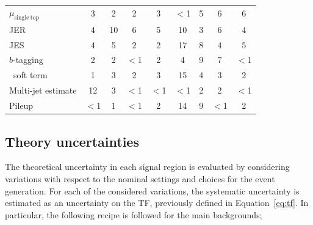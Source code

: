 \begin{table}[htpb]
\begin{center}
\begin{tabular}{lcccccccc}
						{$\mu_{\mathrm{single~top}}$} & 3 & 2 & 2 & 3 & {$<$1\phantom{15}} & 5 & 6 & 6\\  
						{JER} & 4 & 10 & 6 & 5 & 10 & 3 & 6 & 4\\  
						{JES} & 4 & 5 & 2 & 2 & 17 & 8 & 4 & 5\\  
						{$b$-tagging} & 2 & 2 & {$<$1\phantom{15}} & 2 & 4 & 9 & 7 & {$<$1\phantom{15}}\\  
						{\met\ soft term} & 1 & 3 & 2 & 3 & 15 & 4 & 3 & 2\\  
						{Multi-jet estimate} & 12 & 3 & {$<$1\phantom{15}} & {$<$1\phantom{15}} & {$<$1\phantom{15}} & 2 & 2 & {$<$1\phantom{15}}\\  
						{Pileup} & {$<$1\phantom{15}} & 1 & {$<$1\phantom{15}} & 2 & 14 & 9 & {$<$1\phantom{15}} & 2\\  
						\bottomrule
					\end{tabular}
				\end{center}
			\end{table}


		\subsection{Theory uncertainties}

			The theoretical uncertainty in each signal region is evaluated by considering variations with respect to the nominal settings and choices for the event generation. For each of the considered variations, the systematic uncertainty is estimated as an uncertainty on the \ac{TF}, previously defined in Equation~\ref{eq:tf}. In particular, the following recipe is followed for the main backgrounds; 


